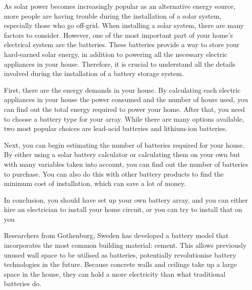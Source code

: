 \date{\today}



\maketitle
\thispagestyle{fancy}

\begin{multicols}{3}


As solar power becomes increasingly popular as an alternative energy source, more people are having trouble during the installation of a solar system, especially those who go off-grid. When installing a solar system, there are many factors to consider. However, one of the most important part of your home's electrical system are the batteries. These batteries provide a way to store your hard-earned solar energy, in addition to powering all the necessary electric appliances in your house. Therefore, it is crucial to understand all the details involved during the installation of a battery storage system.

First, there are the energy demands in your house. By calculating each electric appliances in your house the power consumed and the number of hours used, you can find out the total energy required to power your home. After that, you need to choose a battery type for your array. While there are many options available, two most popular choices are lead-acid batteries and lithium-ion batteries.

Next, you can begin estimating the number of batteries required for your house. By either using a solar battery calculator or calculating them on your own but with many variables taken into account, you can find out the number of batteries to purchase. You can also do this with other battery products to find the minimum cost of installation, which can save a lot of money.

In conclusion, you should have set up your own battery array, and you can either hire an electrician to install your home circuit, or you can try to install that on you  
\closearticle


Researchers from Gothenburg, Sweden has developed a battery model that incorporates the most common building material: cement. This allows previously unused wall space to be utilised as batteries, potentially revolutionise battery technologies in the future. Because concrete walls and ceilings take up a large space in the house, they can hold a more electricity than what traditional batteries do. 

\closearticle

\end{multicols}
\restoregeometry